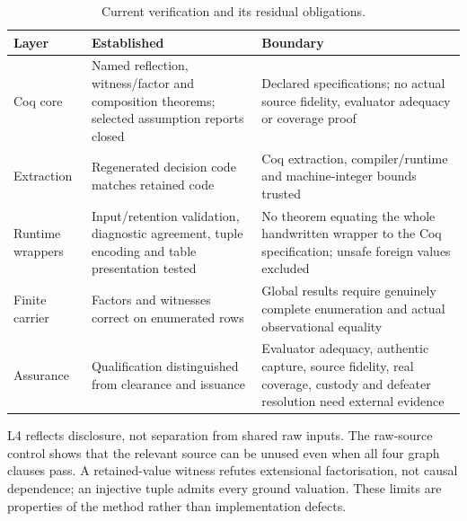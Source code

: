 \documentclass[smallextended,envcountsect,envcountsame,natbib]{svjour3}
\begin{document}
\begin{table}[htbp]
\centering\scriptsize
\caption{Current verification and its residual obligations.}\label{ex:tab:trust-boundary}
\begin{tabularx}{\textwidth}{@{}p{2.1cm}LL@{}}
\toprule
Layer & Established & Boundary \\
\midrule
Coq core & Named reflection, witness/factor and composition theorems; selected assumption reports closed & Declared specifications; no actual source fidelity, evaluator adequacy or coverage proof \\
Extraction & Regenerated decision code matches retained code & Coq extraction, compiler/runtime and machine-integer bounds trusted \\
Runtime wrappers & Input/retention validation, diagnostic agreement, tuple encoding and table presentation tested & No theorem equating the whole handwritten wrapper to the Coq specification; unsafe foreign values excluded \\
Finite carrier & Factors and witnesses correct on enumerated rows & Global results require genuinely complete enumeration and actual observational equality \\
Assurance & Qualification distinguished from clearance and issuance & Evaluator adequacy, authentic capture, source fidelity, real coverage, custody and defeater resolution need external evidence \\
\bottomrule
\end{tabularx}
\end{table}
\FloatBarrier

L4 reflects disclosure, not separation from shared raw inputs. The raw-source control shows that the relevant source can be unused even when all four graph clauses pass. A retained-value witness refutes extensional factorisation, not causal dependence; an injective tuple admits every ground valuation. These limits are properties of the method rather than implementation defects.
\end{document}
